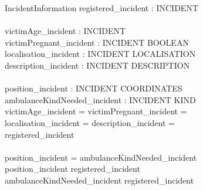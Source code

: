 \documentclass[12pt]{article}
\begin{document}
\begin{schema}{IncidentInformation}
	registered\_incident : \power INCIDENT \\
	\newline \\
	victimAge\_incident : INCIDENT \pfun \nat \\ %
	victimPregnant\_incident : INCIDENT \pfun BOOLEAN \\
	localisation\_incident : INCIDENT \pfun LOCALISATION \\
	description\_incident : INCIDENT \pfun DESCRIPTION \\
	\newline \\
	position\_incident : INCIDENT \pfun COORDINATES \\
	ambulanceKindNeeded\_incident : INCIDENT \pfun KIND \\
  \where
  	\dom victimAge\_incident = \dom victimPregnant\_incident =\\
	 \dom localisation\_incident = \dom description\_incident =\\
	 registered\_incident \\
	 \newline \\
	 \dom position\_incident = \dom ambulanceKindNeeded\_incident \\
	 \dom position\_incident \subseteq registered\_incident \\
	 \dom ambulanceKindNeeded\_incident  \subseteq registered\_incident \\ %
\end{schema}
\end{document}
